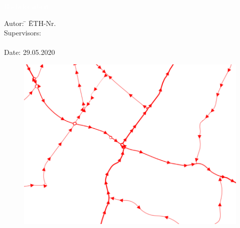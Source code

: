 %
%
%
%


\begin{titlepage}


{
\vspace{5mm}
{\Huge\textcolor{white}{Bachelorarbeit}}\\[4mm]
{\Huge\textcolor{white}{\textbf{\mytitle}}}

{\color{white} 
\begin{tabbing}
Autor: \hspace{20mm} \= \myauthor \hspace{20mm} \= ETH-Nr. \myethnr \\[3mm]
Supervisors: \> \myprofessor\\[1mm]
\> \mysupervisor\\[3mm]
Date: 29.05.2020
\end{tabbing}
}
}
\vspace{20mm}

\begin{figure}[h!]
	\centering
	\includegraphics[width=\textwidth]{figures/f-01-02-Titelbild-GIS}
\end{figure}





\end{titlepage}


%

